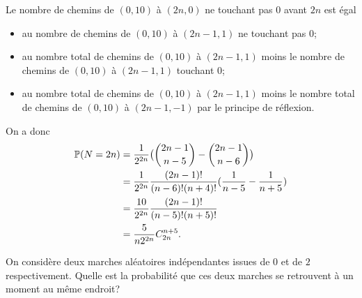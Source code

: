 \documentclass[11pt]{td_um}
\begin{document}
\begin{exo}{}
\begin{enumerate}
{             Le nombre de chemins de $(0,10)$ à $(2n,0)$ ne touchant pas $0$ avant $2n$ est égal 
             \begin{itemize}
                 \item au nombre de chemins de $(0,10)$ à $(2n-1,1)$ ne touchant pas $0$;
                 \item au nombre total de chemins de $(0,10)$ à $(2n-1,1)$ moins le nombre de chemins de $(0,10)$ à $(2n-1,1)$ touchant $0$;
                 \item au nombre total de chemins de $(0,10)$ à $(2n-1,1)$ moins le nombre total de chemins de $(0,10)$ à $(2n-1,-1)$ par le principe de réflexion.
             \end{itemize}
             On a donc
             \begin{align*}
                 \mathbb{P}(N=2n)
                 &=\frac{1}{2^{2n}}\big(\binom{2n-1}{n-5}-\binom{2n-1}{n-6}\big)\\
                 &=\frac{1}{2^{2n}}\frac{(2n-1)!}{(n-6)!(n+4)!}(\frac{1}{n-5}-\frac{1}{n+5})\\
                 &=\frac{10}{2^{2n}}\frac{(2n-1)!}{(n-5)!(n+5)!}\\
                 &=\frac{5}{n2^{2n}}C^{n+5}_{2n}.
             \end{align*}
         }
 \end{enumerate}
\end{exo}


\begin{exo}{} %
On considère deux marches aléatoires indépendantes issues de $0$ et de $2$ respectivement. Quelle est la probabilité que ces deux marches se retrouvent à un moment au même endroit?
\end{exo}
\end{document}
